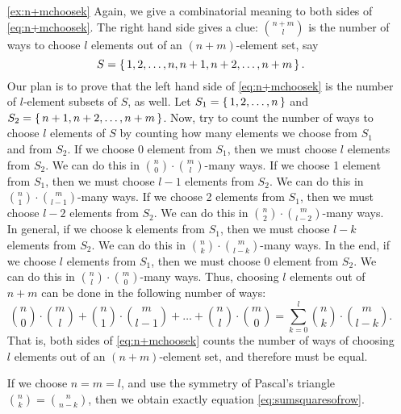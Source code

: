 \begin{enumerate}
\item[\ref{ex:n+mchoosek}]
Again, we give a combinatorial meaning to both sides of \eqref{eq:n+mchoosek}. 
The right hand side gives a clue: 
$\binom{n+m}{l}$ is the number of ways to choose $l$ elements out of an $(n+m)$-element set, 
say 
\[
S = \left\{\,1, 2, \dots , n, n+1, n+2, \dots , n+m\,\right\}.
\] 
Our plan is to prove that the left hand side of \eqref{eq:n+mchoosek} is the number of $l$-element subsets of $S$, as well. 
Let $S_1 = \left\{\,1, 2, \dots , n\,\right\}$ and $S_2 = \left\{\,n+1, n+2, \dots , n+m\,\right\}$. 
Now, try to count the number of ways to choose $l$ elements of $S$ by counting how many elements we choose from $S_1$ and from $S_2$. 
If we choose 0 element from $S_1$, then we must choose $l$ elements from $S_2$. 
We can do this in $\binom{n}{0} \cdot \binom{m}{l}$-many ways. 
If we choose 1 element from $S_1$, then we must choose $l-1$ elements from $S_2$. 
We can do this in $\binom{n}{1} \cdot \binom{m}{l-1}$-many ways. 
If we choose 2 elements from $S_1$, then we must choose $l-2$ elements from $S_2$. 
We can do this in $\binom{n}{2} \cdot \binom{m}{l-2}$-many ways. 
In general, if we choose k elements from $S_1$, then we must choose $l-k$ elements from $S_2$. 
We can do this in $\binom{n}{k} \cdot \binom{m}{l-k}$-many ways. 
In the end, if we choose $l$ elements from $S_1$, then we must choose $0$ element from $S_2$. 
We can do this in $\binom{n}{l} \cdot \binom{m}{0}$-many ways. 
Thus, choosing $l$ elements out of $n+m$ can be done in the following number of ways: 
\[
\binom{n}{0} \cdot \binom{m}{l} + \binom{n}{1} \cdot \binom{m}{l-1} + \dots %
+ \binom{n}{l}\cdot \binom{m}{0} = \sum_{k=0}^l \binom{n}{k} \cdot \binom{m}{l-k}. 
\]
That is, both sides of \eqref{eq:n+mchoosek} counts the number of ways of choosing $l$ elements out of an $(n+m)$-element set, 
and therefore must be equal. 

If we choose $n=m=l$, 
and use the symmetry of Pascal's triangle $\binom{n}{k} = \binom{n}{n-k}$, 
then we obtain exactly equation \eqref{eq:sumsquaresofrow}. 


\end{enumerate}
